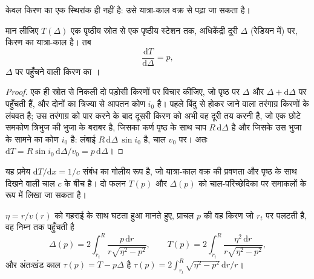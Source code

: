 \begin{omfigure}
\par{}
\label{fig:b3:seismology-imaging:shells}
\end{omfigure}

 केवल किरण का एक स्थिरांक ही नहीं है: उसे
यात्रा-काल वक्र से पढ़ा जा सकता है।

\begin{theorem}[यात्रा-काल वक्र की प्रवणता]\label{thm:b3:seismology-imaging:benndorf}
मान लीजिए $T(\Delta)$ एक पृष्ठीय स्रोत से एक पृष्ठीय
स्टेशन तक, अधिकेंद्री दूरी $\Delta$ (रेडियन में) पर, किरण का यात्रा-काल है। तब
\[
  \frac{\mathrm dT}{\mathrm d\Delta} = p ,
\]
$\Delta$ पर पहुँचने वाली किरण का ।
\end{theorem}

\begin{proof}
एक ही स्रोत से निकली दो पड़ोसी किरणों पर विचार कीजिए, जो पृष्ठ पर
$\Delta$ और $\Delta + \mathrm d\Delta$ पर पहुँचती हैं, और दोनों का त्रिज्या से आपतन कोण $i_0$
है। पहले बिंदु से होकर जाने वाला तरंगाग्र किरणों के लंबवत है;
उस तरंगाग्र को पार करने के बाद दूसरी किरण को अभी वह दूरी तय करनी है, जो
एक छोटे समकोण त्रिभुज की भुजा के बराबर है, जिसका कर्ण पृष्ठ के साथ चाप $R\,\mathrm d\Delta$ है
और जिसके उस भुजा के सामने का कोण $i_0$ है: लंबाई
$R\,\mathrm d\Delta\,\sin i_0$ है, चाल $v_0$ पर। अतः
$\mathrm dT = R\sin i_0\,\mathrm d\Delta/v_0 = p\,\mathrm d\Delta$।
\end{proof}

यह प्रमेय $\mathrm dT/\mathrm dx = 1/c$ संबंध का गोलीय रूप है, जो
यात्रा-काल वक्र की प्रवणता और पृष्ठ के साथ दिखने वाली चाल $c$ के बीच है।
दो फलन $T(p)$ और $\Delta(p)$ को
चाल-परिच्छेदिका पर समाकलों के रूप में लिखा जा सकता है।

\begin{proposition}[यात्रा-काल और दूरी समाकल के रूप में]\label{prop:b3:seismology-imaging:integrals}
$\eta = r/v(r)$ को गहराई के साथ घटता हुआ मानते हुए, प्राचल $p$ की वह किरण जो
$r_t$ पर पलटती है, वह निम्न तक पहुँचती है
\[
  \Delta(p) = 2\int_{r_t}^{R}\frac{p\,\mathrm dr}{r\sqrt{\eta^2 - p^2}},
  \qquad
  T(p) = 2\int_{r_t}^{R}\frac{\eta^2\,\mathrm dr}{r\sqrt{\eta^2 - p^2}},
\]
और अंतःखंड काल $\tau(p) = T - p\Delta$ है
$\tau(p) = 2\int_{r_t}^{R}\sqrt{\eta^2 - p^2}\,\mathrm dr/r$।
\end{proposition}

